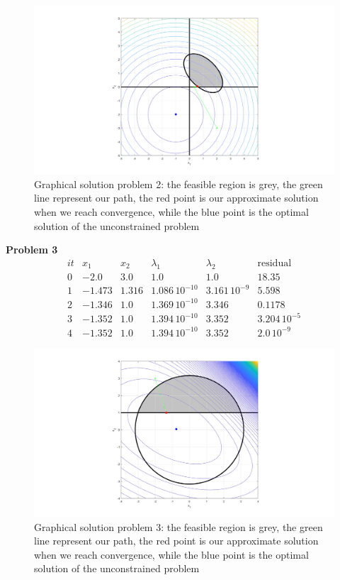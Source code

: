 \documentclass{article}
\begin{document}
\begin{figure}[H]
    \centering
    \includegraphics[width=16cm]{fig2_sqp.png}
    \caption{Graphical solution problem 2: the feasible region is grey, the green line represent our path, the red point is our approximate solution when we reach convergence, while the blue point is the optimal solution of the unconstrained problem }
\end{figure}
\bigskip


\textbf{Problem 3}\\
\[
\begin{array}{cccccc}
it &  x_1 & x_2 & \lambda_1 & \lambda_2  & \text{residual}\\
\hline
0 & -2.0 & 3.0 & 1.0 & 1.0 & 18.35\\ 1 & -1.473 & 1.316 & 1.086\,{10}^{-10} & 3.161\,{10}^{-9} & 5.598\\ 2 & -1.346 & 1.0 & 1.369\,{10}^{-10} & 3.346 & 0.1178\\ 3 & -1.352 & 1.0 & 1.394\,{10}^{-10} & 3.352 & 3.204\,{10}^{-5}\\ 4 & -1.352 & 1.0 & 1.394\,{10}^{-10} & 3.352 & 2.0\,{10}^{-9} \end{array}
\]







\begin{figure}[H]
    \centering
    \includegraphics[width=16cm]{fig3_sqp.png}
    \caption{Graphical solution problem 3: the feasible region is grey, the green line represent our path, the red point is our approximate solution when we reach convergence, while the blue point is the optimal solution of the unconstrained problem }
\end{figure}
\end{document}
